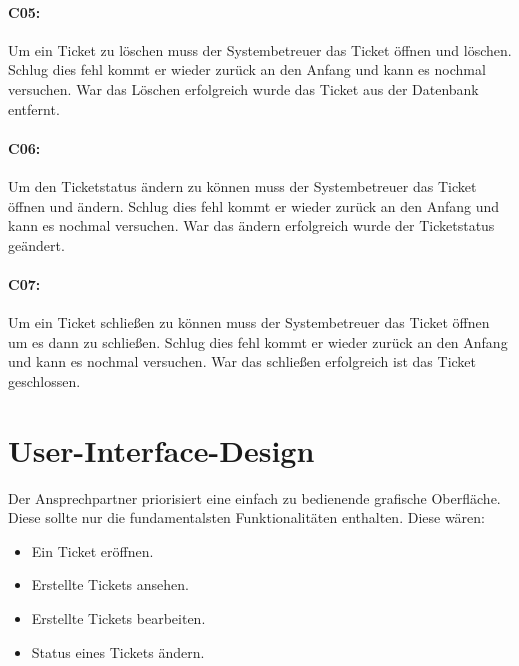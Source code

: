 \paragraph{C05:}
Um ein Ticket zu löschen muss der Systembetreuer das Ticket öffnen und löschen. Schlug dies fehl kommt er wieder zurück an den Anfang und kann es nochmal versuchen. War das Löschen erfolgreich wurde das Ticket aus der Datenbank entfernt.
\paragraph{C06:}
Um den Ticketstatus ändern zu können muss der Systembetreuer das Ticket öffnen und ändern. Schlug dies fehl kommt er wieder zurück an den Anfang und kann es nochmal versuchen. War das ändern erfolgreich wurde der Ticketstatus geändert.
\paragraph{C07:}
Um ein Ticket schließen zu können muss der Systembetreuer das Ticket öffnen um es dann zu schließen. Schlug dies fehl kommt er wieder zurück an den Anfang und kann es nochmal versuchen. War das schließen erfolgreich ist das Ticket geschlossen.

\newpage

\section{User-Interface-Design}
\label{UserInterfaceDesign}
Der Ansprechpartner priorisiert eine einfach zu bedienende grafische Oberfläche. Diese sollte nur die fundamentalsten Funktionalitäten enthalten. Diese wären:

\begin{itemize}
	\item Ein Ticket eröffnen.
	\item Erstellte Tickets ansehen.
	\item Erstellte Tickets bearbeiten.
	\item Status eines Tickets ändern.
\end{itemize}
\paragraph{}

